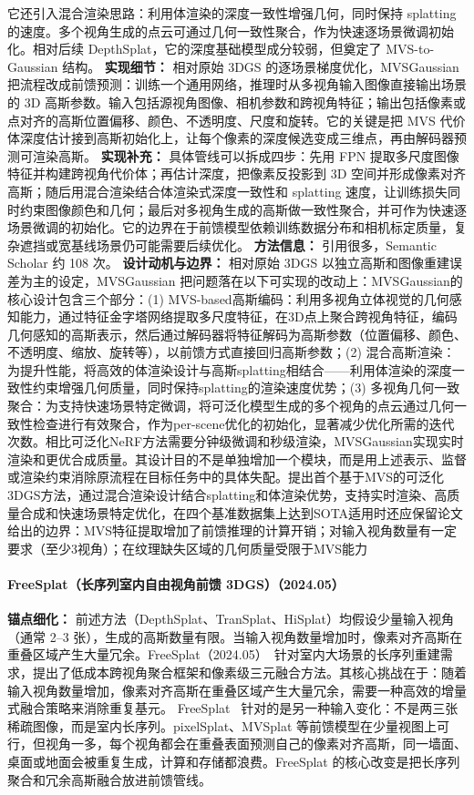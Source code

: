 它还引入混合渲染思路：利用体渲染的深度一致性增强几何，同时保持 splatting 的速度。多个视角生成的点云可通过几何一致性聚合，作为快速逐场景微调初始化。相对后续 DepthSplat，它的深度基础模型成分较弱，但奠定了 MVS-to-Gaussian 结构。
\textbf{实现细节：} 相对原始 3DGS 的逐场景梯度优化，MVSGaussian 把流程改成前馈预测：训练一个通用网络，推理时从多视角输入图像直接输出场景的 3D 高斯参数。输入包括源视角图像、相机参数和跨视角特征；输出包括像素或点对齐的高斯位置偏移、颜色、不透明度、尺度和旋转。它的关键是把 MVS 代价体深度估计接到高斯初始化上，让每个像素的深度候选变成三维点，再由解码器预测可渲染高斯。
\textbf{实现补充：} 具体管线可以拆成四步：先用 FPN 提取多尺度图像特征并构建跨视角代价体；再估计深度，把像素反投影到 3D 空间并形成像素对齐高斯；随后用混合渲染结合体渲染式深度一致性和 splatting 速度，让训练损失同时约束图像颜色和几何；最后对多视角生成的高斯做一致性聚合，并可作为快速逐场景微调的初始化。它的边界在于前馈模型依赖训练数据分布和相机标定质量，复杂遮挡或宽基线场景仍可能需要后续优化。
\textbf{方法信息：} 引用很多，Semantic Scholar 约 108 次。
\textbf{设计动机与边界：} 相对原始 3DGS 以独立高斯和图像重建误差为主的设定，MVSGaussian 把问题落在以下可实现的改动上：MVSGaussian的核心设计包含三个部分：(1) MVS-based高斯编码：利用多视角立体视觉的几何感知能力，通过特征金字塔网络提取多尺度特征，在3D点上聚合跨视角特征，编码几何感知的高斯表示，然后通过解码器将特征解码为高斯参数（位置偏移、颜色、不透明度、缩放、旋转等），以前馈方式直接回归高斯参数；(2) 混合高斯渲染：为提升性能，将高效的体渲染设计与高斯splatting相结合——利用体渲染的深度一致性约束增强几何质量，同时保持splatting的渲染速度优势；(3) 多视角几何一致聚合：为支持快速场景特定微调，将可泛化模型生成的多个视角的点云通过几何一致性检查进行有效聚合，作为per-scene优化的初始化，显著减少优化所需的迭代次数。相比可泛化NeRF方法需要分钟级微调和秒级渲染，MVSGaussian实现实时渲染和更优合成质量。其设计目的不是单独增加一个模块，而是用上述表示、监督或渲染约束消除原流程在目标任务中的具体失配。提出首个基于MVS的可泛化3DGS方法，通过混合渲染设计结合splatting和体渲染优势，支持实时渲染、高质量合成和快速场景特定优化，在四个基准数据集上达到SOTA适用时还应保留论文给出的边界：MVS特征提取增加了前馈推理的计算开销；对输入视角数量有一定要求（至少3视角）；在纹理缺失区域的几何质量受限于MVS能力
\paragraph{FreeSplat（长序列室内自由视角前馈 3DGS）（2024.05）}
\textbf{锚点细化：} 前述方法（DepthSplat、TranSplat、HiSplat）均假设少量输入视角（通常 2--3 张），生成的高斯数量有限。当输入视角数量增加时，像素对齐高斯在重叠区域产生大量冗余。FreeSplat（2024.05）~\cite{2405_17958}针对室内大场景的长序列重建需求，提出了低成本跨视角聚合框架和像素级三元融合方法。其核心挑战在于：随着输入视角数量增加，像素对齐高斯在重叠区域产生大量冗余，需要一种高效的增量式融合策略来消除重复基元。
FreeSplat~\cite{2405_17958} 针对的是另一种输入变化：不是两三张稀疏图像，而是室内长序列。pixelSplat、MVSplat 等前馈模型在少量视图上可行，但视角一多，每个视角都会在重叠表面预测自己的像素对齐高斯，同一墙面、桌面或地面会被重复生成，计算和存储都浪费。FreeSplat 的核心改变是把长序列聚合和冗余高斯融合放进前馈管线。

